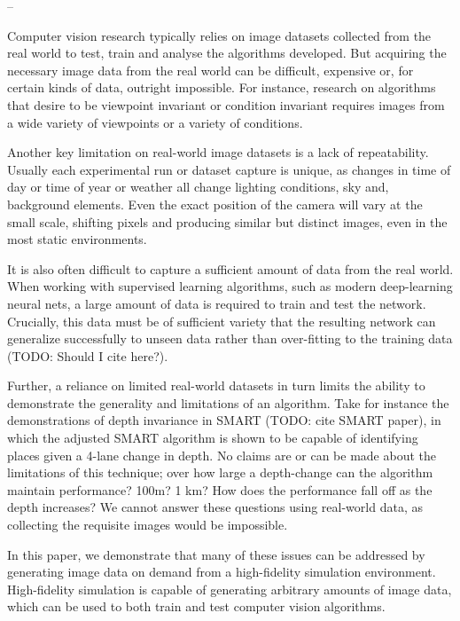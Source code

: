 --

Computer vision research typically relies on image datasets collected from the real world to test, train and analyse the algorithms developed. But acquiring the necessary image data from the real world can be difficult, expensive or, for certain kinds of data, outright impossible. For instance, research on algorithms that desire to be viewpoint invariant or condition invariant requires images from a wide variety of viewpoints or a variety of conditions. 

Another key limitation on real-world image datasets is a lack of repeatability. Usually each experimental run or dataset capture is unique, as changes in time of day or time of year or weather all change lighting conditions, sky and, background elements. Even the exact position of the camera will vary at the small scale, shifting pixels and producing similar but distinct images, even in the most static environments.

It is also often difficult to capture a sufficient amount of data from the real world. When working with supervised learning algorithms, such as modern deep-learning neural nets, a large amount of data is required to train and test the network. Crucially, this data must be of sufficient variety that the resulting network can generalize successfully to unseen data rather than over-fitting to the training data (TODO: Should I cite here?).

Further, a reliance on limited real-world datasets in turn limits the ability to demonstrate the generality and limitations of an algorithm. Take for instance the demonstrations of depth invariance in SMART (TODO: cite SMART paper), in which the adjusted SMART algorithm is shown to be capable of identifying places given a 4-lane change in depth. No claims are or can be made about the limitations of this technique; over how large a depth-change can the algorithm maintain performance? 100m? 1 km? How does the performance fall off as the depth increases? We cannot answer these questions using real-world data, as collecting the requisite images would be impossible.

In this paper, we demonstrate that many of these issues can be addressed by generating image data on demand from a high-fidelity simulation environment. High-fidelity simulation is capable of generating arbitrary amounts of image data, which can be used to both train and test computer vision algorithms.